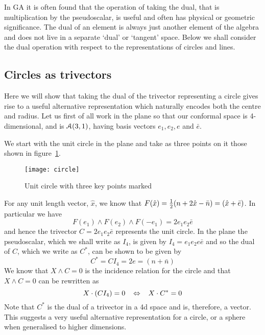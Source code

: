 In GA it is often found that the operation of taking the dual, that
is multiplication by the pseudoscalar, is useful and
often has physical or geometric significance. The dual of an element
is always just another element of the algebra and does not live
in a separate `dual' or `tangent' space. Below we shall consider
the dual operation with respect to the representations of circles 
and lines.

\subsection{Circles as trivectors}
\label{sec:circles}

Here we will show that taking the dual of the trivector representing
a circle gives rise to a useful alternative representation which
naturally encodes both the centre and radius.
Let us first of all work in the plane so that our conformal space is
4-dimensional, and is
${\mathcal{A}}(3,1)$, having basis vectors $e_1,e_2,e$ and $\bar{e}$. 

We start with the unit circle in the plane and take as three points
on it those shown in figure~\ref{figcircle}.
\begin{figure}
\centerline{
\texttt{[image: circle]}
} \caption{Unit circle with three key points marked}
\label{figcircle}
\end{figure}
%
For any unit length vector, $\hat{x}$, we know that
$F(\hat{x})= \frac{1}{2} ( n + 2\hat{x} -\bar{n}) = (\hat{x} + \bar{e})$.
In particular we have
%
\[ F(e_1) \wedge F(e_2) \wedge F(-e_1) = 2e_1e_2\bar{e} \]
%
and hence the trivector $C = 2e_1e_2\bar{e}$ represents the unit circle.
In the plane the pseudoscalar, which we shall write as $I_4$,
is given by $I_4 = e_1e_2e\bar{e}$ and so the dual of
$C$, which we write as $C^{*}$, can be shown to be
given by
%
\begin{equation}
 C^{*}=CI_4 = 2e = (n+\bar{n})
 \end{equation}
We know that $X\wedge C=0$ is the incidence relation for the circle  and that
$X \wedge C = 0 $ can be rewritten as
%
\[ X \cdot (CI_4) =0  \;\;\; \Leftrightarrow \;\;\; X\cdot C^{*} = 0  \]
%
Note that $C^{*}$ is the dual of a trivector in a 4d space and is, therefore,
a vector. This suggests a very useful alternative representation
for a circle, or a sphere when generalised to higher dimensions.

